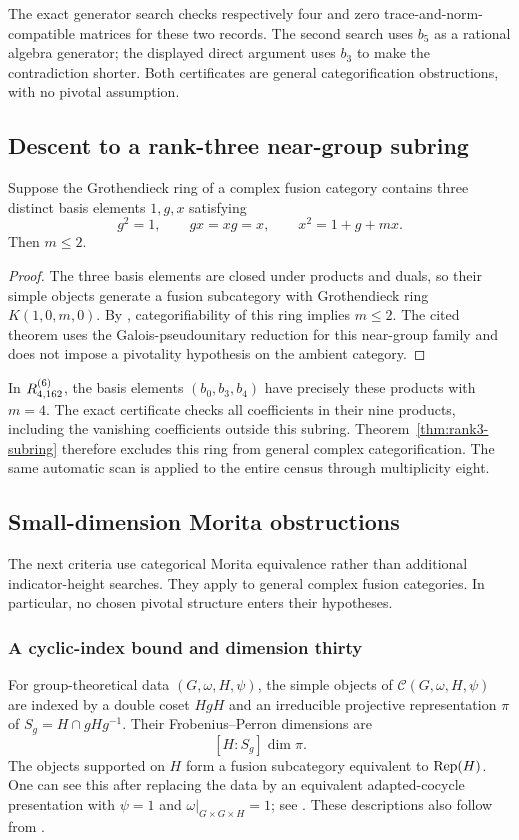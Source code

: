 The exact generator search checks respectively four and zero
trace-and-norm-compatible matrices for these two records. The second
search uses $b_5$ as a rational algebra generator; the displayed direct
argument uses $b_3$ to make the contradiction shorter. Both certificates
are general categorification obstructions, with no pivotal assumption.


\subsection{Descent to a rank-three near-group subring}
\begin{theorem}\label{thm:rank3-subring}
Suppose the Grothendieck ring of a complex fusion category contains
three distinct basis elements $1,g,x$ satisfying
\[
 g^2=1,\qquad gx=xg=x,\qquad x^2=1+g+mx.
\]
Then $m\leq2$.
\end{theorem}
\begin{proof}
The three basis elements are closed under products and duals, so their
simple objects generate a fusion subcategory with Grothendieck ring
$K(1,0,m,0)$. By \cite[Theorem~4.1]{Ostrik3}, categorifiability of this
ring implies $m\leq2$. The cited theorem uses the Galois-pseudounitary
reduction for this near-group family and does not impose a pivotality
hypothesis on the ambient category.
\end{proof}

In $R^{(6)}_{4,162}$, the basis elements $(b_0,b_3,b_4)$ have precisely
these products with $m=4$. The exact certificate checks all coefficients
in their nine products, including the vanishing coefficients outside
this subring. Theorem~\ref{thm:rank3-subring} therefore excludes this
ring from general complex categorification. The same automatic scan is
applied to the entire census through multiplicity eight.

\subsection{Small-dimension Morita obstructions}\label{sec:small-morita}
The next criteria use categorical Morita equivalence rather than additional
indicator-height searches. They apply to general complex fusion categories.
In particular, no chosen pivotal structure enters their hypotheses.

\subsubsection{A cyclic-index bound and dimension thirty}
For group-theoretical data $(G,\omega,H,\psi)$, the simple objects of
$\mathcal C(G,\omega,H,\psi)$ are indexed by a double coset $HgH$ and
an irreducible projective representation $\pi$ of
$S_g=H\cap gHg^{-1}$. Their Frobenius--Perron dimensions are
\begin{equation}\label{eq:gt-fp-new}
 [H:S_g]\dim\pi.
\end{equation}
The objects supported on $H$ form a fusion subcategory equivalent to
$\operatorname{Rep}(H)$. One can see this after replacing the data by an equivalent
adapted-cocycle presentation with $\psi=1$ and
$\omega|_{G\times G\times H}=1$; see
\cite[Proposition~2.5]{SchGT}. These descriptions also follow from
\cite{GNgt}.

